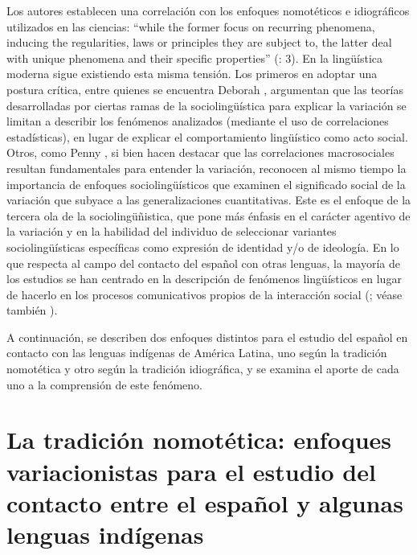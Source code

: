 \documentclass[output=paper]{langscibook}
\begin{document}
Los autores establecen una correlación con los enfoques nomotéticos e idiográficos utilizados en las ciencias: “while the former focus on recurring phenomena, inducing the regularities, laws or principles they are subject to, the latter deal with unique phenomena and their specific properties” (\citealt{GuyHinskens2016}: 3). En la lingüística moderna     sigue existiendo esta misma tensión. Los primeros en adoptar una postura crítica, entre quienes se encuentra Deborah \citet{Cameron1990}, argumentan que las teorías desarrolladas por ciertas ramas de la sociolingüística para explicar la variación se limitan a describir los fenómenos analizados (mediante el uso de correlaciones estadísticas), en lugar de explicar el comportamiento lingüístico como acto social. Otros, como Penny \citet{Eckert2018}, si bien hacen destacar que las correlaciones macrosociales resultan fundamentales para entender la variación, reconocen al mismo tiempo la importancia de enfoques sociolingüísticos que examinen el significado social de la variación que subyace a las generalizaciones cuantitativas. Este es el enfoque de la tercera ola de la sociolingüñistica, que pone más énfasis en el carácter agentivo de la variación y en la habilidad del individuo de seleccionar variantes sociolingüísticas específicas como expresión de identidad y/o de ideología. En lo que respecta al campo del contacto del español con otras lenguas, la mayoría de los estudios se han centrado en la descripción de fenómenos lingüísticos en lugar de hacerlo en los procesos comunicativos propios de la interacción social (\citealt{KleeLynch2009book}; véase también \citealt{CollinsBaynhamSlembrouck2009}).

A continuación, se describen dos enfoques distintos para el estudio del español en contacto con las lenguas indígenas de América Latina, uno según la tradición nomotética y otro según la tradición idiográfica, y se examina el aporte de cada uno a la comprensión de este fenómeno.


\section{La tradición nomotética: enfoques variacionistas para el estudio del contacto entre el español y algunas lenguas indígenas}
\end{document}
